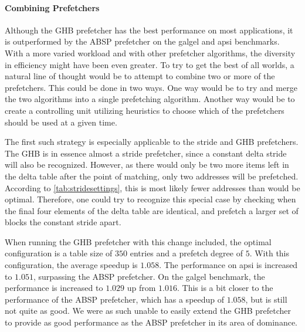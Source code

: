 \paragraph{Combining Prefetchers}
\label{par:prefcombo}
Although the GHB prefetcher has the best performance on most
applications, it is outperformed by the ABSP prefetcher on the galgel
and apsi benchmarks. With a more varied workload and with other
prefetcher algorithms, the diversity in efficiency might have been
even greater. To try to get the best of all worlds, a natural line of
thought would be to attempt to combine two or more of the
prefetchers. This could be done in two ways. One way would be to try
and merge the two algorithms into a single prefetching
algorithm. Another way would be to create a controlling unit utilizing
heuristics to choose which of the prefetchers should be used at a
given time.

The first such strategy is especially applicable to the stride and GHB
prefetchers. The GHB is in essence almost a stride prefetcher, since a
constant delta stride will also be recognized. However, as there would
only be two more items left in the delta table after the point of
matching, only two addresses will be prefetched. According to
\autoref{tab:stridesettings}, this is most likely fewer addresses than
would be optimal. Therefore, one could try to recognize this special
case by checking when the final four elements of the delta table are
identical, and prefetch a larger set of blocks the constant stride
apart.

When running the GHB prefetcher with this change included, the optimal
configuration is a table size of $350$ entries and a prefetch degree
of $5$. With this configuration, the average speedup is $1.058$. The
performance on apsi is increased to $1.051$, surpassing the ABSP
prefetcher. On the galgel benchmark, the performance is increased to
$1.029$ up from $1.016$. This is a bit closer to the performance of
the ABSP prefetcher, which has a speedup of $1.058$, but is still not
quite as good. We were as such unable to easily extend the GHB
prefetcher to provide as good performance as the ABSP prefetcher in
its area of dominance.
